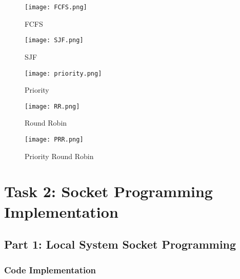 \documentclass{article}
\begin{document}
\begin{figure}[H]
    \centering
    \texttt{[image: FCFS.png]}
    \caption{FCFS}
    \label{fig:fcfs}
\end{figure}

\begin{figure}[H]
    \centering
    \texttt{[image: SJF.png]}
    \caption{SJF}
    \label{fig:sjf}
\end{figure}

\begin{figure}[H]
    \centering
    \texttt{[image: priority.png]}
    \caption{Priority}
    \label{fig:priority}
\end{figure}

\begin{figure}[H]
    \centering
    \texttt{[image: RR.png]}
    \caption{Round Robin}
    \label{fig:RR}
\end{figure}

\begin{figure}[H]
    \centering
    \texttt{[image: PRR.png]}
    \caption{Priority Round Robin}
    \label{fig:PRR}
\end{figure}

\section*{Task 2: Socket Programming Implementation}

\subsection*{Part 1: Local System Socket Programming}

\subsubsection*{Code Implementation}
\end{document}
